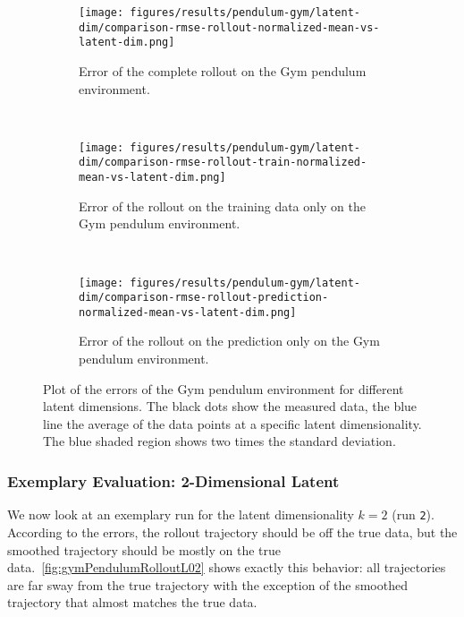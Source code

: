			\begin{figure}
				\centering
				\begin{subfigure}{0.7\linewidth}
					\centering
					\texttt{[image: figures/results/pendulum-gym/latent-dim/comparison-rmse-rollout-normalized-mean-vs-latent-dim.png]}
					\caption[Error of the complete rollout on the Gym pendulum environment]{Error of the complete rollout on the Gym pendulum environment.}
					\label{fig:gymPendulumRmseComplete}
				\end{subfigure} \\
				\begin{subfigure}{0.5\linewidth}
					\centering
					\texttt{[image: figures/results/pendulum-gym/latent-dim/comparison-rmse-rollout-train-normalized-mean-vs-latent-dim.png]}
					\caption[Error of the training rollout on the Gym pendulum environment]{Error of the rollout on the training data only on the Gym pendulum environment.}
					\label{fig:gymPendulumRmseTrain}
				\end{subfigure}%
				~
				\begin{subfigure}{0.5\linewidth}
					\centering
					\texttt{[image: figures/results/pendulum-gym/latent-dim/comparison-rmse-rollout-prediction-normalized-mean-vs-latent-dim.png]}
					\caption[Error of the prediction rollout on the Gym pendulum environment]{Error of the rollout on the prediction only on the Gym pendulum environment.}
					\label{fig:gymPendulumRmsePred}
				\end{subfigure}
				\caption[Errors on the Gym pendulum environment for different latent dimensions]{Plot of the errors of the Gym pendulum environment for different latent dimensions. The black dots show the measured data, the blue line the average of the data points at a specific latent dimensionality. The blue shaded region shows two times the standard deviation.}
				\label{fig:gymPendulumRmse}
			\end{figure}

		\subsubsection{Exemplary Evaluation: 2-Dimensional Latent}
			We now look at an exemplary run for the latent dimensionality \( k = 2 \) (run \texttt{2}). According to the errors, the rollout trajectory should be off the true data, but the smoothed trajectory should be mostly on the true data.~\autoref{fig:gymPendulumRolloutL02} shows exactly this behavior: all trajectories are far sway from the true trajectory with the exception of the smoothed trajectory that almost matches the true data.

